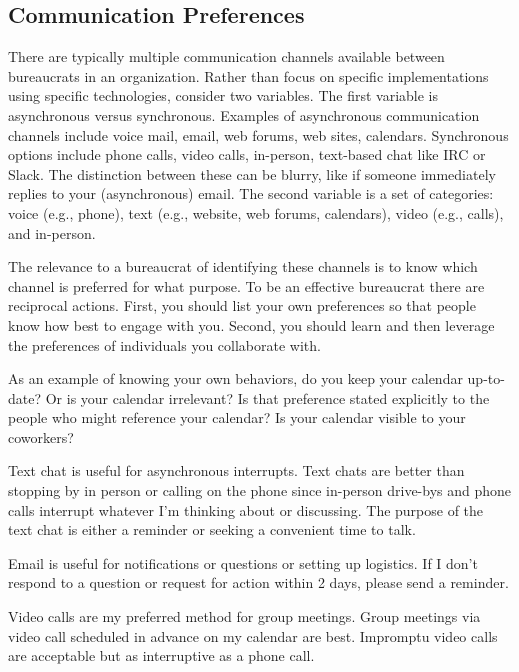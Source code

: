 \subsection{Communication Preferences}

There are typically multiple communication channels available between bureaucrats in an organization. Rather than focus on specific implementations using specific technologies, consider two variables. The first variable is asynchronous versus synchronous. Examples of asynchronous communication channels include voice mail, email, web forums, web sites, calendars. Synchronous options include phone calls, video calls, in-person, text-based chat like IRC or Slack. The distinction between these can be blurry, like if someone immediately replies to your (asynchronous) email.  The second variable is a set of categories: voice (e.g., phone), text (e.g., website, web forums, calendars), video (e.g., calls), and in-person. 


The relevance to a bureaucrat of identifying these channels is to know which channel is preferred for what purpose. To be an effective bureaucrat there are reciprocal actions. First, you should list your own preferences so that people know how best to engage with you. Second, you should learn and then leverage the preferences of individuals you collaborate with.

As an example of knowing your own behaviors, do you keep your calendar up-to-date? Or is your calendar irrelevant? Is that preference stated explicitly to the people who might reference your calendar? Is your calendar visible to your coworkers?

Text chat is useful for asynchronous interrupts. Text chats are better than stopping by in person or calling on the phone since in-person drive-bys and phone calls interrupt whatever I'm thinking about or discussing. The purpose of the text chat is either a reminder or seeking a convenient time to talk. 

Email is useful for notifications or questions or setting up logistics. If I don't respond to a question or request for action within 2 days, please send a reminder. 

Video calls are my preferred method for group meetings. Group meetings via video call scheduled in advance on my calendar are best. Impromptu video calls are acceptable but as interruptive as a phone call. 

